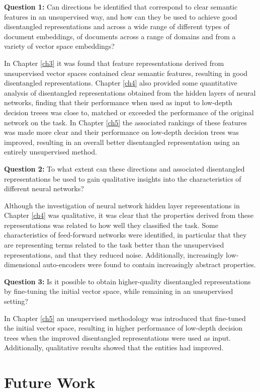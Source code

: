 \textbf{Question 1:} Can directions be identified that correspond to clear semantic features in an unsupervised way, and how can they be used to achieve good disentangled representations and across a wide range of different types of document embeddings,  of documents across a range of domains and from a variety of vector space embeddings?

In Chapter \ref{ch3} it was found that feature representations derived from unsupervised vector spaces contained clear semantic features, resulting in good disentangled representations. Chapter \ref{ch4} also provided some quantitative analysis of  disentangled representations obtained from the hidden layers of neural networks, finding that their performance when used as input to low-depth decision treees was close to, matched or exceeded the performance of the original network on the task. In Chapter \ref{ch5} the associated rankings of these features was made more clear and their performance on low-depth decision trees was improved, resulting in an overall better disentangled representation using an entirely unsupervised method.

\textbf{Question 2:} To what extent can these directions and associated disentangled representations be used to gain qualitative insights into the characteristics of different neural networks?

Although the investigation of neural network hidden layer representations in Chapter \ref{ch4} was qualitative, it was clear that the properties derived from these representations was related to how well they classified the task. Some characteristics of feed-forward networks were identified, in particular that they are representing terms related to the task better than the unsupervised representations, and that they reduced noise. Additionally, increasingly low-dimensional auto-encoders were found to contain increasingly abstract properties.

\textbf{Question 3:} Is it possible to obtain higher-quality disentangled representations by fine-tuning the initial vector space, while remaining in an unsupervised setting?

In Chapter \ref{ch5} an unsupervised methodology was introduced that fine-tuned the initial vector space, resulting in higher performance of low-depth decision trees  when the improved disentangled representations were used as input. Additionally, qualitative results showed that the entities had improved. 


\section{Future Work}

